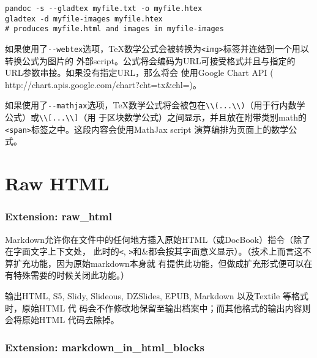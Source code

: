 \documentclass[cn]{elegantbook}
\newcommand{\passthrough}[1]{#1}
\begin{document}
\begin{lstlisting}
pandoc -s --gladtex myfile.txt -o myfile.htex
gladtex -d myfile-images myfile.htex
# produces myfile.html and images in myfile-images
\end{lstlisting}

如果使用了\passthrough{\lstinline!--webtex!}选项，TeX数学公式会被转换为\passthrough{\lstinline!<img>!}标签并连结到一个用以转换公式为图片的
外部script。公式将会编码为URL可接受格式并且与指定的URL参数串接。如果没有指定URL，那么将会
使用Google Chart API (
http://chart.apis.google.com/chart?cht=tx\&chl=)。

如果使用了\passthrough{\lstinline!--mathjax!}选项，TeX数学公式将会被包在\passthrough{\lstinline!\\(...\\)!}（用于行内数学公式）或\passthrough{\lstinline!\\[...\\]!}（用
于区块数学公式）之间显示，并且放在附带类别math的\passthrough{\lstinline!<span>!}标签之中。这段内容会使用MathJax
script 演算编排为页面上的数学公式。

\hypertarget{raw-html}{%
\section{Raw HTML}\label{raw-html}}

\hypertarget{extension-raw_html}{%
\subsubsection{Extension: raw\_html}\label{extension-raw_html}}

Markdown允许你在文件中的任何地方插入原始HTML（或DocBook）指令（除了在字面文字上下文处，
此时的\passthrough{\lstinline!<!},
\passthrough{\lstinline!>!}和\&都会按其字面意义显示）。（技术上而言这不算扩充功能，因为原始markdown本身就
有提供此功能，但做成扩充形式便可以在有特殊需要的时候关闭此功能。）

输出HTML, S5, Slidy, Slideous, DZSlides, EPUB, Markdown 以及Textile
等格式时，原始HTML 代
码会不作修改地保留至输出档案中；而其他格式的输出内容则会将原始HTML
代码去除掉。

\hypertarget{extension-markdown_in_html_blocks}{%
\subsubsection{Extension:
markdown\_in\_html\_blocks}\label{extension-markdown_in_html_blocks}}
\end{document}
